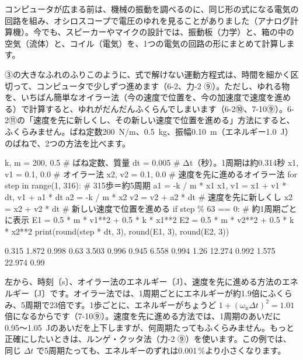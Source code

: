 \begin{phmijika}
コンピュータが広まる前は、機械の振動を調べるのに、同じ形の式になる電気の回路を組み、オシロスコープで電圧のゆれを見ることがありました（アナログ計算機）。今でも、スピーカーやマイクの設計では、振動板（力学）と、箱の中の空気（流体）と、コイル（電気）を、1つの電気の回路の形にまとめて計算します。
\end{phmijika}

\label{ph:波-1:sec11}
③の大きなふれのふりこのように、式で解けない運動方程式は、時間を細かく区切って、コンピュータで少しずつ進めます（6-2、力-2 ⑨）。ただし、ゆれる物を、いちばん簡単なオイラー法（今の速度で位置を、今の加速度で速度を進める）で計算すると、ゆれがだんだんふくらんでしまいます（6-2⑩、7-10⑨）。6-2⑪の「速度を先に新しくし、その新しい速度で位置を進める」方法にすると、ふくらみません。ばね定数\qty{200}{N/m}、\qty{0.5}{kg}、振幅\qty{0.10}{m}（エネルギー\qty{1.0}{J}）のばねで、2つの方法を比べます。
\begin{phcode}[Python]
k, m = 200, 0.5           \# ばね定数、質量
dt = 0.005                \# Δt（秒）。1周期は約0.314秒
x1, v1 = 0.1, 0.0         \# オイラー法
x2, v2 = 0.1, 0.0         \# 速度を先に進めるオイラー法
for step in range(1, 316):         \# 315歩＝約5周期
    a1 = -k / m * x1
    x1, v1 = x1 + v1 * dt, v1 + a1 * dt
    a2 = -k / m * x2
    v2 = v2 + a2 * dt              \# 速度を先に新しくし
    x2 = x2 + v2 * dt              \# 新しい速度で位置を進める
    if step \% 63 == 0:             \# 約1周期ごとに表示
        E1 = 0.5 * m * v1**2 + 0.5 * k * x1**2
        E2 = 0.5 * m * v2**2 + 0.5 * k * x2**2
        print(round(step * dt, 3), round(E1, 3), round(E2, 3))
\end{phcode}
\begin{phcodeout}
0.315 1.872 0.998
0.63 3.503 0.996
0.945 6.558 0.994
1.26 12.274 0.992
1.575 22.974 0.99
\end{phcodeout}
左から、時刻〔s〕、オイラー法のエネルギー〔J〕、速度を先に進める方法のエネルギー〔J〕です。オイラー法では、1周期ごとにエネルギーが約1.9倍にふくらみ、5周期で23倍です。1歩ごとに、エネルギーがちょうど $1+(\omega_{\mathrm n}\Delta t)^2=1.01$ 倍になるからです（7-10⑨）。速度を先に進める方法では、1周期のあいだに0.95〜\qty{1.05}{J}のあいだを上下しますが、何周期たってもふくらみません。もっと正確にしたいときは、ルンゲ・クッタ法（力-2 ⑨）を使います。この例では、同じ $\Delta t$ で5周期たっても、エネルギーのずれは0.001\,\%より小さくなります。

